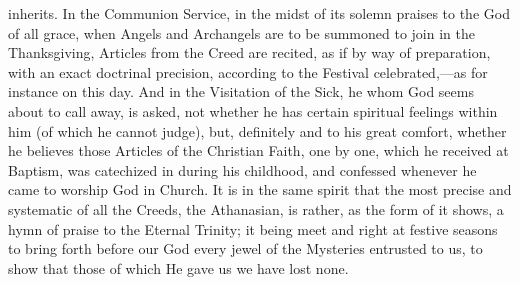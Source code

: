 inherits. In the Communion Service, in the midst of its solemn praises
to the God of all grace, when Angels and Archangels are to be summoned
to join in the Thanksgiving, Articles from the Creed are recited, as if
by way of preparation, with an exact doctrinal precision, according to
the Festival celebrated,—as for instance on this day. And in the
Visitation of the Sick, he whom God seems about to call away, is asked,
not whether he has certain spiritual feelings within him (of which he
cannot judge), but, definitely and to his great comfort, whether he
believes those Articles of the Christian Faith, one by one, which he
received at Baptism, was catechized in during his childhood, and
confessed whenever he came to worship God in Church. It is in the same
spirit that the most precise and systematic of all the Creeds, the
Athanasian, is rather, as the form of it shows, a hymn of praise to the
Eternal Trinity; it being meet and right at festive seasons to bring
forth before our God every jewel of the Mysteries entrusted to us, to
show that those of which He gave us we have lost none.

